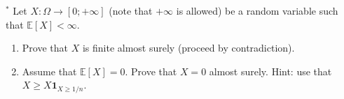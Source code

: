 \begin{Exercise}
    ${ }^{*}$ Let $X: \Omega \rightarrow[0 ;+\infty]$ (note that $+\infty$ is allowed) be a random variable such that $\mathbb{E}[X]<\infty$.

\begin{enumerate}
  \item Prove that $X$ is finite almost surely (proceed by contradiction).

  \item Assume that $\mathbb{E}[X]=0$. Prove that $X=0$ almost surely. Hint: use that $X \geq X \mathbf{1}_{X \geq 1 / n}$.

\end{enumerate}
\end{Exercise}
